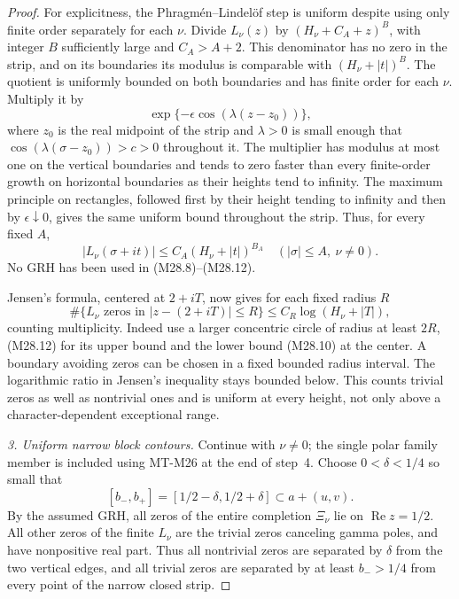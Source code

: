\begin{proof}
For explicitness, the Phragm\'en--Lindel\"of step is
uniform despite using only finite order separately
for each \(\nu\). Divide \(L_\nu(z)\) by
\((H_\nu+C_A+z)^B\), with integer \(B\) sufficiently
large and \(C_A>A+2\). This denominator has no zero
in the strip, and on its boundaries its modulus
is comparable with \((H_\nu+|t|)^B\). The quotient
is uniformly bounded on both boundaries and has
finite order for each \(\nu\). Multiply it by
\[
          \exp\{-\epsilon\cos(\lambda(z-z_0))\},
 \]
where \(z_0\) is the real midpoint of the strip and
\(\lambda>0\) is small enough that
\(\cos(\lambda(\sigma-z_0))>c>0\) throughout it.
The multiplier has modulus at most one on the
vertical boundaries and tends to zero faster than
every finite-order growth on horizontal boundaries
as their heights tend to infinity. The maximum
principle on rectangles, followed first by their
height tending to infinity and then by
\(\epsilon\downarrow0\), gives the same uniform
bound throughout the strip. Thus, for every
fixed \(A\),
\[
       |L_\nu(\sigma+it)|
           \le C_A(H_\nu+|t|)^{B_A}
                 \quad (|\sigma|\le A,\ \nu\ne0).
                                                               \tag{M28.12}
\]
No GRH has been used in (M28.8)--(M28.12).

Jensen's formula, centered at \(2+iT\), now gives
for each fixed radius \(R\)
\[
  \#\{L_\nu\text{ zeros in }|z-(2+iT)|\le R\}
             \le C_R\log(H_\nu+|T|),                           \tag{M28.13}
\]
counting multiplicity. Indeed use a larger concentric
circle of radius at least \(2R\), (M28.12) for its
upper bound and the lower bound (M28.10) at the
center. A boundary avoiding zeros can be chosen in
a fixed bounded radius interval. The logarithmic
ratio in Jensen's inequality stays bounded below.
This counts trivial zeros as well as nontrivial
ones and is uniform at every height, not only
above a character-dependent exceptional range.

\emph{3. Uniform narrow block contours.}
Continue with \(\nu\ne0\); the single polar family
member is included using MT-M26 at the end of step~4.
Choose \(0<\delta<1/4\) so small that
\[
 [b_-,b_+]=[1/2-\delta,1/2+\delta]
                         \subset a+(u,v).
 \]
By the assumed GRH, all zeros of the entire
completion \(\Xi_\nu\) lie on \(\operatorname{Re}z=1/2\).
All other zeros of the finite \(L_\nu\) are the
trivial zeros canceling gamma poles, and have
nonpositive real part. Thus all nontrivial zeros
are separated by \(\delta\) from the two vertical
edges, and all trivial zeros are separated by at
least \(b_->1/4\) from every point of the narrow
closed strip.


\end{proof}
